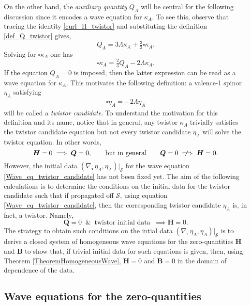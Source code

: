 \documentclass[10pt,a4paper]{article}
\theoremstyle{plain}
\def\bmB{{\bm B}}
\def\bmH{{\bm H}}
\def\bmQ{{\bm Q}}
\newcommand{\notimplies}{%
  \mathrel{{\ooalign{\hidewidth$\not\phantom{=}$\hidewidth\cr$\implies$}}}}
\begin{document}
  On the other hand, the \emph{auxiliary quantity}
  $Q_A$ will be central for the following discussion since it
  encodes a wave equation for $\kappa_A$. To see this, observe that
  tracing the identity \eqref{curl_H_twistor} and substituting the
  definition \eqref{def_Q_twistor} gives,
\begin{equation}\label{Q_to_box_twistor_candidate}
Q_{A} = 3 \Lambda \kappa _{A} + \tfrac{3}{2} \square \kappa _{A}.
\end{equation}
Solving for $\square \kappa _{A}$ one has
\[
\square \kappa _{A} = \tfrac{2}{3} Q_{A} -2 \Lambda \kappa _{A}.
\]
If the equation $Q_{A}=0$ is imposed, then
the latter expression can be read as a wave equation for $\kappa_A$.
This motivates the following definition: a valence-1 spinor $\eta_A$ satisfying
\begin{align} \label{Wave_eq_twistor_candidate}
\square \eta _{A} = -2 \Lambda  \eta _{A}
\end{align}
will be called a \emph{twistor candidate}. To understand the
motivation for this definition and its name, notice that in general,
any twistor $\kappa_A$ trivially satisfies the twistor candidate
equation but not every twistor candidate $\eta_A$ will solve the
twistor equation. In other words,
\[
\bmH=0 \implies \bmQ =0, \qquad \text{but in general} \qquad \bmQ =0 \notimplies \bmH=0.
\]
However,  the initial data $(\nabla_{\bm\tau}
\eta_A, \eta_A)|_{\mathcal{S}}$ for the wave equation
\eqref{Wave_eq_twistor_candidate} has not been fixed yet. The aim of the following
calculations is to determine the conditions on the initial data for the
twistor candidate such that if propagated off $\mathcal{S}$, using
equation \eqref{Wave_eq_twistor_candidate}, then the corresponding twistor
candidate $\eta_A$ is, in fact, a twistor. Namely,
\begin{equation}
\bmQ =0 \;\;\&\;\; \text{twistor initial data} \;\;\implies \bmH=0.
\end{equation}
The strategy to obtain such conditions on the intial data
$(\nabla_{\bm\tau} \eta_A, \eta_A)|_{\mathcal{S}}$  is to derive a closed
system of homogeneous wave equations for the zero-quantities $\bmH$
and $\bmB$ to show that, if trivial initial data for such
equations is given, then, using Theorem \ref{TheoremHomogeneousWave},
$\bmH=0$ and $\bmB=0$ in the domain of dependence of the data.

\subsection{Wave equations for the zero-quantities}
\end{document}
